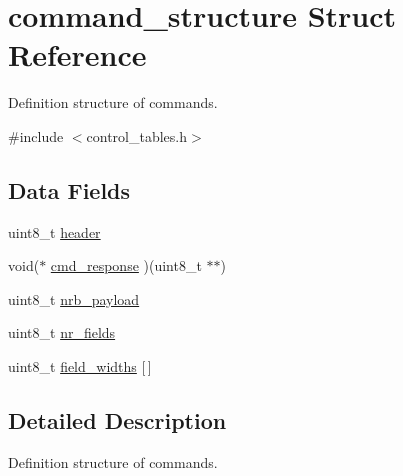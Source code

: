\hypertarget{structcommand__structure}{
\section{command\-\_\-structure \-Struct \-Reference}
\label{structcommand__structure}
}


\-Definition structure of commands.  




{\ttfamily \#include $<$control\-\_\-tables.\-h$>$}

\subsection*{\-Data \-Fields}
\begin{DoxyCompactItemize}
\item 
uint8\-\_\-t \hyperlink{structcommand__structure_a448f375c590f94439eeed8c3287a1119}{header}
\item 
void($\ast$ \hyperlink{structcommand__structure_aebeb85ab86cf52981c2294e0ff785717}{cmd\-\_\-response} )(uint8\-\_\-t $\ast$$\ast$)
\item 
uint8\-\_\-t \hyperlink{structcommand__structure_a4e170d613deb0c63c5f6053aa4dfc257}{nrb\-\_\-payload}
\item 
uint8\-\_\-t \hyperlink{structcommand__structure_a6ea64013ccdb9f90c0b39d9103c93892}{nr\-\_\-fields}
\item 
uint8\-\_\-t \hyperlink{structcommand__structure_ac385bdc4001624f566e66b09e7dedcd3}{field\-\_\-widths} \mbox{[}$\,$\mbox{]}
\end{DoxyCompactItemize}


\subsection{\-Detailed \-Description}
\-Definition structure of commands. 

